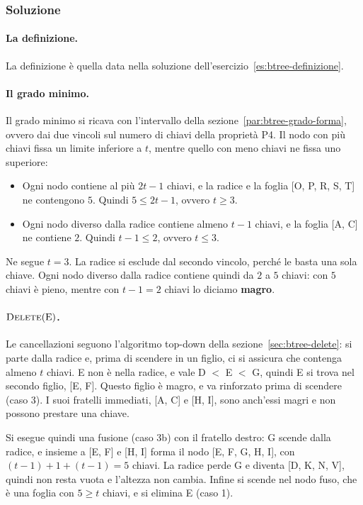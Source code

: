 \subsubsection*{Soluzione}

\paragraph{La definizione.}
La definizione è quella data nella soluzione dell'esercizio~\ref{es:btree-definizione}.

\paragraph{Il grado minimo.}
Il grado minimo si ricava con l'intervallo della sezione~\ref{par:btree-grado-forma}, ovvero dai due vincoli sul numero di chiavi della proprietà P4. Il nodo con più chiavi fissa un limite inferiore a $t$, mentre quello con meno chiavi ne fissa uno superiore:
\begin{itemize}
    \item Ogni nodo contiene al più $2t-1$ chiavi, e la radice e la foglia [O, P, R, S, T] ne contengono $5$. Quindi $5 \le 2t-1$, ovvero $t \ge 3$.
    \item Ogni nodo diverso dalla radice contiene almeno $t-1$ chiavi, e la foglia [A, C] ne contiene $2$. Quindi $t-1 \le 2$, ovvero $t \le 3$.
\end{itemize}

Ne segue $t = 3$. La radice si esclude dal secondo vincolo, perché le basta una sola chiave. Ogni nodo diverso dalla radice contiene quindi da $2$ a $5$ chiavi: con $5$ chiavi è pieno, mentre con $t-1 = 2$ chiavi lo diciamo \textbf{magro}.

\paragraph{$\textsc{Delete}(\mathrm{E})$.}
Le cancellazioni seguono l'algoritmo top-down della sezione~\ref{sec:btree-delete}: si parte dalla radice e, prima di scendere in un figlio, ci si assicura che contenga almeno $t$ chiavi. E non è nella radice, e vale D $<$ E $<$ G, quindi E si trova nel secondo figlio, [E, F]. Questo figlio è magro, e va rinforzato prima di scendere (caso 3). I suoi fratelli immediati, [A, C] e [H, I], sono anch'essi magri e non possono prestare una chiave.

Si esegue quindi una fusione (caso 3b) con il fratello destro: G scende dalla radice, e insieme a [E, F] e [H, I] forma il nodo [E, F, G, H, I], con $(t-1)+1+(t-1) = 5$ chiavi. La radice perde G e diventa [D, K, N, V], quindi non resta vuota e l'altezza non cambia. Infine si scende nel nodo fuso, che è una foglia con $5 \ge t$ chiavi, e si elimina E (caso 1).

